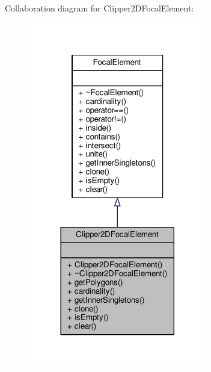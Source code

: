 Collaboration diagram for Clipper2\+D\+Focal\+Element\+:\nopagebreak
\begin{figure}[H]
\begin{center}
\leavevmode
\includegraphics[width=221pt]{classClipper2DFocalElement__coll__graph}
\end{center}
\end{figure}

